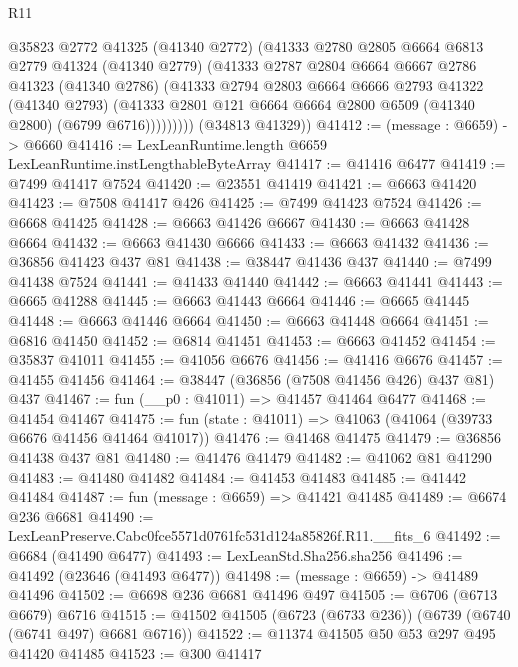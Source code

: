 \begin{lexlean}{R11}
\begin{coremodule}
              @35823
              @2772
              @41325
              (@41340 @2772)
              (@41333
                @2780
                @2805
                @6664
                @6813
                @2779
                @41324
                (@41340 @2779)
                (@41333
                  @2787
                  @2804
                  @6664
                  @6667
                  @2786
                  @41323
                  (@41340 @2786)
                  (@41333
                    @2794
                    @2803
                    @6664
                    @6666
                    @2793
                    @41322
                    (@41340 @2793)
                    (@41333 @2801 @121 @6664 @6664 @2800 @6509 (@41340 @2800) (@6799 @6716)))))))))
      (@34813 @41329))
@41412 := (message : @6659) -> @6660
@41416 := LexLeanRuntime.length @6659 LexLeanRuntime.instLengthableByteArray
@41417 := @41416 @6477
@41419 := @7499 @41417 @7524
@41420 := @23551 @41419
@41421 := @6663 @41420
@41423 := @7508 @41417 @426
@41425 := @7499 @41423 @7524
@41426 := @6668 @41425
@41428 := @6663 @41426 @6667
@41430 := @6663 @41428 @6664
@41432 := @6663 @41430 @6666
@41433 := @6663 @41432
@41436 := @36856 @41423 @437 @81
@41438 := @38447 @41436 @437
@41440 := @7499 @41438 @7524
@41441 := @41433 @41440
@41442 := @6663 @41441
@41443 := @6665 @41288
@41445 := @6663 @41443 @6664
@41446 := @6665 @41445
@41448 := @6663 @41446 @6664
@41450 := @6663 @41448 @6664
@41451 := @6816 @41450
@41452 := @6814 @41451
@41453 := @6663 @41452
@41454 := @35837 @41011
@41455 := @41056 @6676
@41456 := @41416 @6676
@41457 := @41455 @41456
@41464 := @38447 (@36856 (@7508 @41456 @426) @437 @81) @437
@41467 := fun (__p0 : @41011) => @41457 @41464 @6477
@41468 := @41454 @41467
@41475 := fun (state : @41011) => @41063 (@41064 (@39733 @6676 @41456 @41464 @41017))
@41476 := @41468 @41475
@41479 := @36856 @41438 @437 @81
@41480 := @41476 @41479
@41482 := @41062 @81 @41290
@41483 := @41480 @41482
@41484 := @41453 @41483
@41485 := @41442 @41484
@41487 := fun (message : @6659) => @41421 @41485
@41489 := @6674 @236 @6681
@41490 := LexLeanPreserve.Cabc0fce5571d0761fc531d124a85826f.R11.__fits_6
@41492 := @6684 (@41490 @6477)
@41493 := LexLeanStd.Sha256.sha256
@41496 := @41492 (@23646 (@41493 @6477))
@41498 := (message : @6659) -> @41489 @41496
@41502 := @6698 @236 @6681 @41496 @497
@41505 := @6706 (@6713 @6679) @6716
@41515 := @41502 @41505 (@6723 (@6733 @236)) (@6739 (@6740 (@6741 @497) @6681 @6716))
@41522 := @11374 @41505 @50 @53 @297 @495 @41420 @41485
@41523 := @300 @41417

\end{coremodule}
\end{lexlean}
